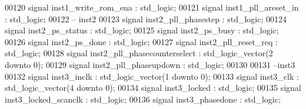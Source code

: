 \begin{DoxyCode}
00120 \textcolor{keywordflow}{signal} \textcolor{vhdlchar}{inst1_write_rom_ena}       \textcolor{vhdlchar}{:} \textcolor{comment}{std\_logic};
00121 \textcolor{keywordflow}{signal} \textcolor{vhdlchar}{inst1_pll_areset_in}       \textcolor{vhdlchar}{:} \textcolor{comment}{std\_logic};
00122 \textcolor{keyword}{-- inst2}
00123 \textcolor{keywordflow}{signal} \textcolor{vhdlchar}{inst2_pll_phasestep}       \textcolor{vhdlchar}{:} \textcolor{comment}{std\_logic};
00124 \textcolor{keywordflow}{signal} \textcolor{vhdlchar}{inst2_ps_status}           \textcolor{vhdlchar}{:} \textcolor{comment}{std\_logic};
00125 \textcolor{keywordflow}{signal} \textcolor{vhdlchar}{inst2_ps_busy}             \textcolor{vhdlchar}{:} \textcolor{comment}{std\_logic};
00126 \textcolor{keywordflow}{signal} \textcolor{vhdlchar}{inst2_ps_done}             \textcolor{vhdlchar}{:} \textcolor{comment}{std\_logic};
00127 \textcolor{keywordflow}{signal} \textcolor{vhdlchar}{inst2_pll_reset_req}       \textcolor{vhdlchar}{:} \textcolor{comment}{std\_logic};
00128 \textcolor{keywordflow}{signal} \textcolor{vhdlchar}{inst2_pll_phasecounterselect} \textcolor{vhdlchar}{:} \textcolor{comment}{std\_logic\_vector}\textcolor{vhdlchar}{(}\textcolor{vhdllogic}{}\textcolor{vhdllogic}{2} \textcolor{keywordflow}{downto} \textcolor{vhdllogic}{}\textcolor{vhdllogic}{0}\textcolor{vhdlchar}{)};
00129 \textcolor{keywordflow}{signal} \textcolor{vhdlchar}{inst2_pll_phaseupdown}        \textcolor{vhdlchar}{:} \textcolor{comment}{std\_logic}; 
00130 
00131 \textcolor{keyword}{--inst3}
00132 \textcolor{keywordflow}{signal} \textcolor{vhdlchar}{inst3_inclk}               \textcolor{vhdlchar}{:} \textcolor{comment}{std\_logic\_vector}\textcolor{vhdlchar}{(}\textcolor{vhdllogic}{}\textcolor{vhdllogic}{1} \textcolor{keywordflow}{downto} \textcolor{vhdllogic}{}\textcolor{vhdllogic}{0}\textcolor{vhdlchar}{)};
00133 \textcolor{keywordflow}{signal} \textcolor{vhdlchar}{inst3_clk}                 \textcolor{vhdlchar}{:} \textcolor{comment}{std\_logic\_vector}\textcolor{vhdlchar}{(}\textcolor{vhdllogic}{}\textcolor{vhdllogic}{4} \textcolor{keywordflow}{downto} \textcolor{vhdllogic}{}\textcolor{vhdllogic}{0}\textcolor{vhdlchar}{)};
00134 \textcolor{keywordflow}{signal} \textcolor{vhdlchar}{inst3_locked}              \textcolor{vhdlchar}{:} \textcolor{comment}{std\_logic};
00135 \textcolor{keywordflow}{signal} \textcolor{vhdlchar}{inst3_locked_scanclk}      \textcolor{vhdlchar}{:} \textcolor{comment}{std\_logic};
00136 \textcolor{keywordflow}{signal} \textcolor{vhdlchar}{inst3_phasedone}           \textcolor{vhdlchar}{:} \textcolor{comment}{std\_logic};

\end{DoxyCode}
